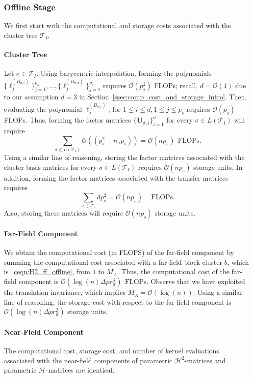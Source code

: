 \documentclass[final,3p,times]{elsarticle}
\newcommand{\mc}[1]{\mathcal{#1}}
\newcommand{\mat}[1]{\boldsymbol{#1}}
\begin{document}
\subsubsection{Offline Stage}
We first start with the computational and storage costs associated with the cluster tree $\mc{T}_{I}$.
\paragraph{Cluster Tree}
Let $\sigma \in \mc{T}_{I} $. Using barycentric interpolation, forming the polynomials $\{\ell_j^{(B_{\sigma, i})} \}_{j=1}^{p_s}, \dots, \{\ell_j^{(B_{\sigma, d})} \}_{j=1}^{p_s}$ requires $\mc{O}(p_s^2)$ FLOPs; recall, $d = \mc{O}(1)$ due to our assumption $d=3$ in Section~\ref{ssec:comp_cost_and_storage_intro}. Then, evaluating the polynomial $\ell_{j}^{(B_{\sigma, i})}$, for $1 \le i \le d, 1 \le j \le p_s$ requires $\mc{O}(p_s)$ FLOPs. Thus, forming the factor matrices $\{\mat{U}_{\sigma, i} \}_{i=1}^{d}$ for every $\sigma \in L(\mc{T}_{I})$ will require
$$\sum_{\sigma \in L(\mc{T}_{I})} \mc{O}((p_s^2 + n_{\sigma}p_s)) = \mc{O}(np_s) ~ ~ \text{FLOPs}.$$
Using a similar line of reasoning, storing the factor matrices associated with the cluster basis matrices for every $\sigma \in L(\mc{T}_{I})$ requires $\mc{O}(np_s)$ storage units. 
In addition, forming the factor matrices associated with the transfer matrices requires 
$$\sum_{\sigma \in \mc{T}_{I}}dp_s^2 = \mc{O}(np_s) ~ \quad \text{FLOPs}.$$
Also, storing these matrices will require $\mc{O}(np_s)$ storage units. 


\paragraph{Far-Field Component}
We obtain the computational cost (in FLOPS) of the far-field component by summing the computational cost associated with a far-field block cluster $b$, which is~\eqref{ceqn:H2_ff_offline}, from $1$ to $M_A$. Thus, the computational cost of the far-field component is
$\mc{O}(\log(n) \Delta pr_{\text{ff}}^3) ~~ \text{FLOPs}.$
Observe that we have exploited the translation invariance, which implies $M_{A} = \mc{O}(\log(n))$. Using a similar line of reasoning,  the storage cost with respect to the far-field component is $\mc{O}(\log(n) \Delta pr_{\text{ff}}^2)$ storage units. 
\paragraph{Near-Field Component}
The computational cost, storage cost, and number of kernel evaluations associated with the near-field components of parametric $\mc{H}^{2}$-matrices and parametric $\mc{H}$-matrices  are identical. 
\end{document}
